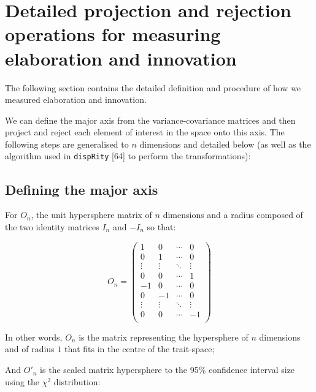 \documentclass[12pt,a4paper]{article}
\begin{document}
%
%

\newpage

\section{Detailed projection and rejection operations for measuring elaboration and innovation}
\label{supp_projection}

The following section contains the detailed definition and procedure of how we measured elaboration and innovation.

We can define the major axis from the variance-covariance matrices and then project and reject each element of interest in the space onto this axis.
The following steps are generalised to $n$ dimensions and detailed below (as well as the algorithm used in \texttt{dispRity} [64]%
to perform the transformations):

\subsection{Defining the major axis}

For $O_{n}$, the unit hypersphere matrix of $n$ dimensions and a radius composed of the two identity matrices $I_{n}$ and $-I_{n}$ so that: 

\begin{equation}
O_{n} = 
    \begin{pmatrix}
        1 & 0 & \cdots & 0 \\
        0 & 1 & \cdots & 0 \\
        \vdots  & \vdots  & \ddots & \vdots  \\
        0 & 0 & \cdots & 1 \\
        -1 & 0 & \cdots & 0 \\
        0 & -1 & \cdots & 0 \\
        \vdots  & \vdots  & \ddots & \vdots  \\
        0 & 0 & \cdots & -1 \\
    \end{pmatrix}
\end{equation}

In other words, $O_{n}$ is the matrix representing the hypersphere of $n$ dimensions and of radius $1$ that fits in the centre of the trait-space;

And $O'_{n}$ is the scaled matrix hypersphere to the 95\% confidence interval size using the $\chi^2$ distribution:
\end{document}
